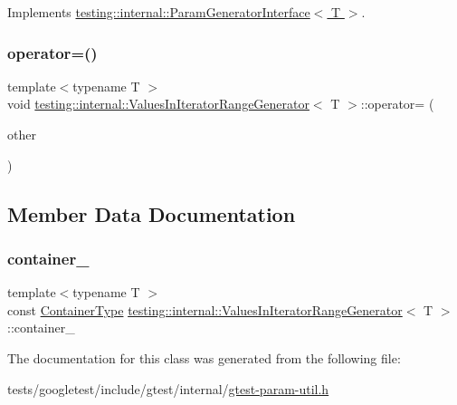 Implements \hyperlink{classtesting_1_1internal_1_1ParamGeneratorInterface_afa7211b74990e11d3fc7ad4e7113da4f}{testing\+::internal\+::\+Param\+Generator\+Interface$<$ T $>$}.

\mbox{\label{classtesting_1_1internal_1_1ValuesInIteratorRangeGenerator_ab43e1feff118f5be232ae1b85d539dd1}} 
\subsubsection{\texorpdfstring{operator=()}{operator=()}}
{\footnotesize\ttfamily template$<$typename T $>$ \\
void \hyperlink{classtesting_1_1internal_1_1ValuesInIteratorRangeGenerator}{testing\+::internal\+::\+Values\+In\+Iterator\+Range\+Generator}$<$ T $>$\+::operator= (\begin{DoxyParamCaption}\item[{const \hyperlink{classtesting_1_1internal_1_1ValuesInIteratorRangeGenerator}{Values\+In\+Iterator\+Range\+Generator}$<$ T $>$ \&}]{other }\end{DoxyParamCaption})\hspace{0.3cm}{\ttfamily [private]}}



\subsection{Member Data Documentation}
\mbox{\label{classtesting_1_1internal_1_1ValuesInIteratorRangeGenerator_ad2701e9149384e64b1b98da5d31eb7a4}} 
\subsubsection{\texorpdfstring{container\+\_\+}{container\_}}
{\footnotesize\ttfamily template$<$typename T $>$ \\
const \hyperlink{classtesting_1_1internal_1_1ValuesInIteratorRangeGenerator_afab6b799a125b471a8784ced9cf7335c}{Container\+Type} \hyperlink{classtesting_1_1internal_1_1ValuesInIteratorRangeGenerator}{testing\+::internal\+::\+Values\+In\+Iterator\+Range\+Generator}$<$ T $>$\+::container\+\_\+\hspace{0.3cm}{\ttfamily [private]}}



The documentation for this class was generated from the following file\+:\begin{DoxyCompactItemize}
\item 
tests/googletest/include/gtest/internal/\hyperlink{gtest-param-util_8h}{gtest-\/param-\/util.\+h}\end{DoxyCompactItemize}
